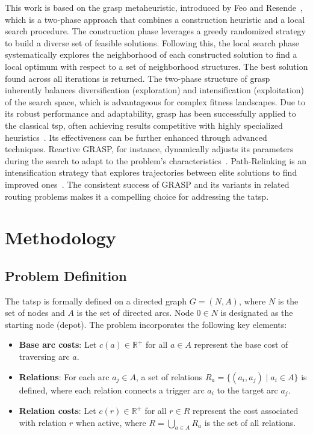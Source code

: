 \documentclass[twocolumn, switch]{article} %
\begin{document}
This work is based on the \gls{grasp} metaheuristic, introduced by Feo and Resende~\cite{Feo1995}, which is a two-phase approach that combines a construction heuristic and a local search procedure.
The construction phase leverages a greedy randomized strategy to build a diverse set of feasible solutions. Following this, the local search phase systematically explores the neighborhood of each constructed solution to find a local optimum with respect to a set of neighborhood structures.
The best solution found across all iterations is returned. The two-phase structure of \gls{grasp} inherently balances diversification (exploration) and intensification (exploitation) of the search space, which is advantageous for complex fitness landscapes.
Due to its robust performance and adaptability, \gls{grasp} has been successfully applied to the classical \gls{tsp}, often achieving results competitive with highly specialized heuristics~\cite{Oliveira2004}. 
Its effectiveness can be further enhanced through advanced techniques. Reactive GRASP, for instance, dynamically adjusts its parameters during the search to adapt to the problem's characteristics~\cite{Prais2000}. 
Path-Relinking is an intensification strategy that explores trajectories between elite solutions to find improved ones~\cite{Resende2019}. The consistent success of GRASP and its variants in related routing problems makes it a compelling choice for addressing the \gls{tatsp}.

\section{Methodology}

\subsection{Problem Definition}

The \gls{tatsp} is formally defined on a directed graph $G = (N, A)$, where $N$ is the set of nodes and $A$ is the set of directed arcs. Node $0 \in N$ is designated as the starting node (depot). The problem incorporates the following key elements:

\begin{itemize}
\item \textbf{Base arc costs}: Let $c(a) \in \mathbb{R}^+$ for all $a \in A$ represent the base cost of traversing arc $a$.
\item \textbf{Relations}: For each arc $a_j \in A$, a set of relations $R_a = \{(a_i, a_j) \mid a_i \in A\}$ is defined, where each relation connects a trigger arc $a_i$ to the target arc $a_j$.
\item \textbf{Relation costs}: Let $c(r) \in \mathbb{R}^+$ for all $r \in R$ represent the cost associated with relation $r$ when active, where $R = \bigcup_{a \in A} R_a$ is the set of all relations.
\end{itemize}
\end{document}
